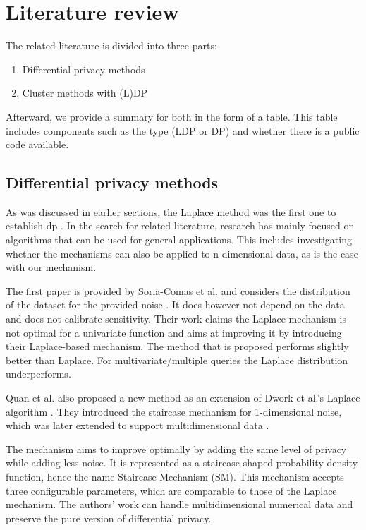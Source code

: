 \section{Literature review} \label{theory:literature-review}
The related literature is divided into three parts:
\begin{enumerate}
  \item Differential privacy methods
  \item Cluster methods with (L)DP
\end{enumerate}
Afterward, we provide a summary for both in the form of a table.
This table includes components such as the type (LDP or DP) and whether there is a public code available.

\subsection{Differential privacy methods}
As was discussed in earlier sections, the Laplace method was the first one to establish \gls{dp} \citep{dwork_differential_2006}.
In the search for related literature, research has mainly focused on algorithms that can be used for general applications.
This includes investigating whether the mechanisms can also be applied to n-dimensional data, as is the case with our mechanism.

The first paper is provided by Soria-Comas et al. and considers the distribution of the dataset for the provided noise \citep{soria-comas_optimal_2013}.
It does however not depend on the data and does not calibrate sensitivity.
Their work claims the Laplace mechanism is not optimal for a univariate function and aims at improving it by introducing their Laplace-based mechanism.
The method that is proposed performs slightly better than Laplace.
For multivariate/multiple queries the Laplace distribution underperforms.

Quan et al. also proposed a new method as an extension of Dwork et al.'s Laplace algorithm \citep{geng_staircase_2013}.
They introduced the staircase mechanism for 1-dimensional noise, which was later extended to support multidimensional data \citep{geng_staircase_2015}.

The mechanism aims to improve optimally by adding the same level of privacy while adding less noise.
It is represented as a staircase-shaped probability density function, hence the name Staircase Mechanism (SM).
This mechanism accepts three configurable parameters, which are comparable to those of the Laplace mechanism.
The authors' work can handle multidimensional numerical data and preserve the pure version of differential privacy.

